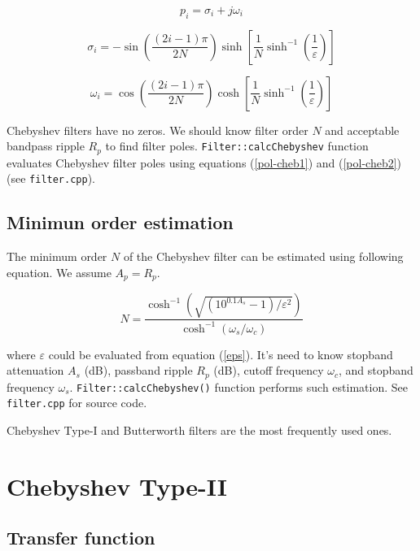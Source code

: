 \begin{equation}
 p_i = \sigma_i + j\omega_i
\end{equation}

\begin{equation}
 \sigma_i = -\sin\left(\frac{(2i-1)\pi}{2N}\right)           
\sinh\left[\frac{1}{N}\sinh^{-1}\left(\frac{1}{\varepsilon}\right)\right]
\label{pol-cheb1}
\end{equation}

\begin{equation}
 \omega_i = \cos\left(\frac{(2i-1)\pi}{2N}\right)           
\cosh\left[\frac{1}{N}\sinh^{-1}\left(\frac{1}{\varepsilon}\right)\right]
\label{pol-cheb2}
\end{equation}

Chebyshev filters have no zeros. We should know filter order $N$ and acceptable
bandpass ripple $R_p$ to find filter poles. \verb|Filter::calcChebyshev|
function evaluates Chebyshev filter poles using equations (\ref{pol-cheb1}) and
(\ref{pol-cheb2}) (see \verb|filter.cpp|).

\subsection{Minimun order estimation}

The minimum order $N$ of the Chebyshev filter can be estimated using following
equation. We assume $A_p=R_p$.

\begin{equation}
 N = \frac{\cosh^{-1}(\sqrt{(10^{0.1A_s}-1)/\varepsilon^2})} 
          {\cosh^{-1}(\omega_s/\omega_c)} \label{cheby1-order}
\end{equation}

where $\varepsilon$ could be evaluated from equation (\ref{eps}). It's need to
know stopband attenuation $A_s$ (dB), passband ripple $R_p$ (dB), cutoff
frequency $\omega_c$, and stopband frequency $\omega_s$.
\verb|Filter::calcChebyshev()| function performs such estimation. See
\verb|filter.cpp| for source code.

Chebyshev Type-I and Butterworth filters are the most frequently used ones.

\section{Chebyshev Type-II}

\subsection{Transfer function}

